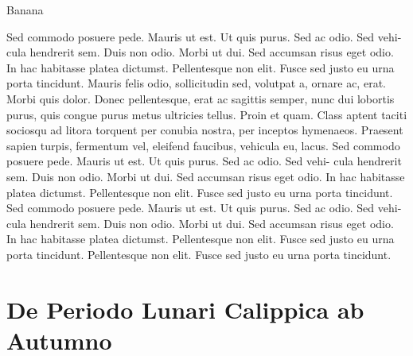 \documentclass[12pt,twoside,a4paper]{book}
\begin{document}
%
%  

Banana

\the\bigskipamount

\the\LTpre

\the\LTpre


\clearpage
\lipsum

Sed commodo posuere pede. Mauris ut est. Ut quis purus. Sed ac odio.
Sed vehi- cula hendrerit sem. Duis non odio. Morbi ut dui.
Sed accumsan risus eget odio. In hac habitasse platea dictumst.
Pellentesque non elit. Fusce sed justo eu urna porta tincidunt.
Mauris felis odio, sollicitudin sed, volutpat a, ornare ac, erat.
Morbi quis dolor. Donec pellentesque, erat ac sagittis semper,
nunc dui lobortis purus, quis congue purus metus ultricies tellus.
Proin et quam. Class aptent taciti sociosqu ad litora torquent per
conubia nostra, per inceptos hymenaeos.
Praesent sapien turpis, fermentum vel, eleifend faucibus, vehicula eu,
lacus.
Sed commodo posuere pede. Mauris ut est. Ut quis purus. Sed ac odio.
Sed vehi- cula hendrerit sem. Duis non odio. Morbi ut dui.
Sed accumsan risus eget odio. In hac habitasse platea dictumst.
Pellentesque non elit. Fusce sed justo eu urna porta tincidunt.
Sed commodo posuere pede. Mauris ut est. Ut quis purus. Sed ac odio.
Sed vehi- cula hendrerit sem. Duis non odio. Morbi ut dui.
Sed accumsan risus eget odio. In hac habitasse platea dictumst.
Pellentesque non elit. Fusce sed justo eu urna porta tincidunt.
Pellentesque non elit. Fusce sed justo eu urna porta tincidunt.

\smallskip


\section{De Periodo Lunari Calippica ab Autumno}

\lipsum

\lipsum[150]

\listoftables
\end{document}
